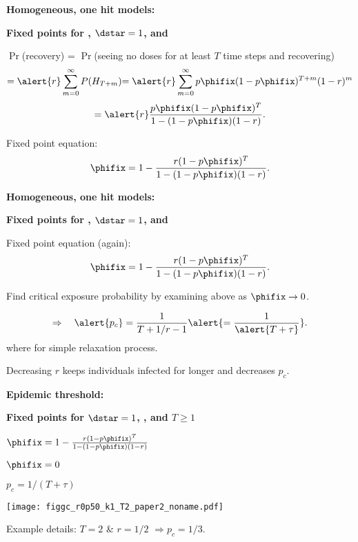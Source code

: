   \textbf{Homogeneous, one hit models:}

  \textbf{Fixed points for , $\dstar=1$, and }
    
    
      $\Pr$(recovery) = $\Pr$(seeing no doses for at least $T$ time steps
      and recovering) 
      $$
      {
        = \alert{r} \sum_{m=0}^{\infty} P(H_{T+m})
      }
      {
        = \alert{r} \sum_{m=0}^{\infty} 
        p\phifix
        (1 -p\phifix)^{T+m}
        (1-r)^{m}
      }
      $$
      $$
      {
        = \alert{r} 
        \frac{p\phifix (1-p\phifix)^T}
        {1 - (1-p\phifix)(1-r)}.
      }
      $$
    
      Fixed point equation:
      $$
      \phifix =
      1 - \frac{r (1-p\phifix)^T }
      {1 - (1-p\phifix)(1-r)}.
      $$
    
  

  \textbf{Homogeneous, one hit models:}

  \textbf{Fixed points for , $\dstar=1$, and }
    
     
      Fixed point equation (again):
      $$
      \phifix =
      1 - \frac{r (1-p\phifix)^T }
      {1 - (1-p\phifix)(1-r)}.
      $$
     
      Find critical exposure probability by examining
      above as $\phifix \rightarrow 0$.
     
      $$
      \Rightarrow \quad 
      \alert{p_c} = \frac{1}{T + 1/r - 1} \alert{= \frac{1}{\alert{T + \tau}}}.
      $$
      where  for simple relaxation
      process.
    
      Decreasing $r$ keeps individuals infected for longer
      and decreases $p_c$.
    
  

  \textbf{Epidemic threshold:}

  \textbf{Fixed points for $\dstar=1$, , and $T \ge 1$}
      
    
     
      $
      \phifix =
      1 - \frac{r (1-p\phifix)^T }
      {1 - (1-p\phifix)(1-r)}
      $
    
      $\phifix = 0$
    
      $p_c = 1/(T+\tau)$
    
    
  \texttt{[image: figgc\_r0p50\_k1\_T2\_paper2\_noname.pdf]}
    

  
  
    Example details:
    $T=2$ \& $r=1/2$ $\Rightarrow p_c = 1/3$.
  
